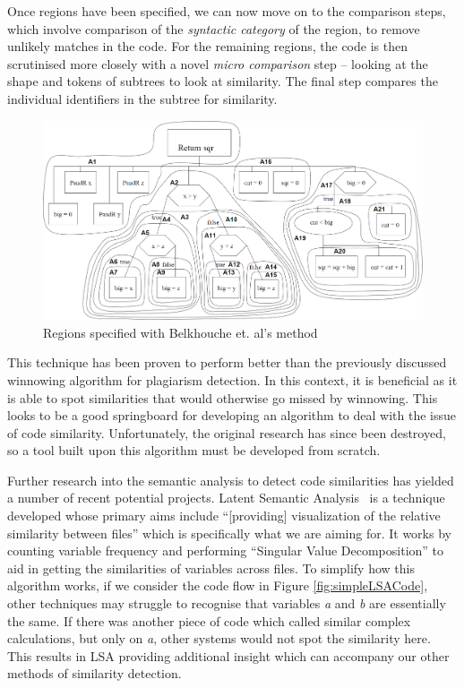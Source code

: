 Once regions have been specified, we can now move on to the comparison steps,
which involve comparison of the \emph{syntactic category} of the region, to 
remove unlikely matches in the code. For the remaining regions, the code
is then scrutinised more closely with a novel \emph{micro comparison} step -- 
looking at the shape and tokens of subtrees to look at similarity. The final step
compares the individual identifiers in the subtree for similarity.

\begin{figure}[h]
	\centering
		\includegraphics[width=\textwidth]{Figures/Belkhouche}
	\caption{Regions specified with Belkhouche et. al's method~\cite{Belkhouche}}
	\label{fig:BelkhoucheComparison}
\end{figure}

This technique has been proven to perform better than the previously discussed
winnowing algorithm for plagiarism detection. In this context, it is beneficial
as it is able to spot similarities that would otherwise go missed by winnowing.
This looks to be a good springboard for developing an algorithm to deal with
the issue of code similarity. Unfortunately,
the original research has since been destroyed, so a tool built upon this algorithm 
must be developed from scratch.

Further research into the semantic analysis to detect code similarities has yielded
a number of recent potential projects. Latent Semantic Analysis~\cite{LatentSemanticAnalysis}
is a technique developed whose primary aims include ``[providing] visualization of
the relative similarity between files'' which is specifically what we are aiming
for. It works by counting variable frequency and performing ``Singular Value 
Decomposition'' to aid in getting the similarities of variables across files. To
simplify how this algorithm works, if we consider the code flow in Figure
\ref{fig:simpleLSACode}, other techniques may struggle to recognise that variables
\emph{a} and \emph{b} are essentially the same. If there was another piece of code
which called similar complex calculations, but only on \emph{a}, other systems 
would not spot the similarity here. This results in LSA providing additional insight
which can accompany our other methods of similarity detection. 


